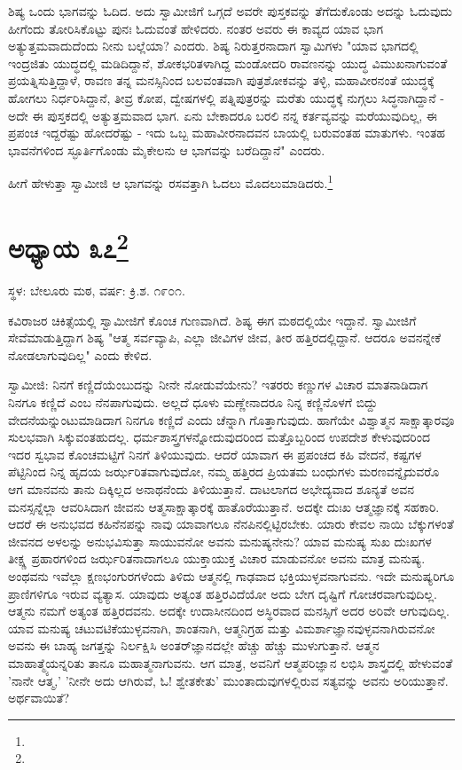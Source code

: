 ಶಿಷ್ಯ ಒಂದು ಭಾಗವನ್ನು ಓದಿದ. ಅದು ಸ್ವಾಮೀಜಿಗೆ ಒಗ್ಗದೆ ಅವರೇ ಪುಸ್ತಕವನ್ನು ತೆಗೆದುಕೊಂಡು ಅದನ್ನು ಓದುವುದು ಹೀಗೆಂದು ತೋರಿಸಿಕೊಟ್ಟು ಪುನಃ ಓದುವಂತೆ ಹೇಳಿದರು. ನಂತರ ಅವರು ಈ ಕಾವ್ಯದ ಯಾವ ಭಾಗ ಅತ್ಯುತ್ತಮವಾದುದೆಂದು ನೀನು ಬಲ್ಲೆಯಾ? ಎಂದರು. ಶಿಷ್ಯ ನಿರುತ್ತರನಾದಾಗ ಸ್ವಾಮಿಗಳು "ಯಾವ ಭಾಗದಲ್ಲಿ ಇಂದ್ರಜಿತು ಯುದ್ಧದಲ್ಲಿ ಮಡಿದಿದ್ದಾನೆ, ಶೋಕಭರಿತಳಾಗಿದ್ದ ಮಂಡೋದರಿ ರಾವಣನನ್ನು ಯುದ್ಧ ವಿಮುಖನಾಗುವಂತೆ ಪ್ರಯತ್ನಿಸುತ್ತಿದ್ದಾಳೆ, ರಾವಣ ತನ್ನ ಮನಸ್ಸಿನಿಂದ ಬಲವಂತವಾಗಿ ಪುತ್ರಶೋಕವನ್ನು ತಳ್ಳಿ, ಮಹಾವೀರನಂತೆ ಯುದ್ಧಕ್ಕೆ ಹೋಗಲು ನಿರ್ಧರಿಸಿದ್ದಾನೆ, ತೀವ್ರ ಕೋಪ, ದ್ವೇಷಗಳಲ್ಲಿ ಪತ್ನಿಪುತ್ರರನ್ನು ಮರೆತು ಯುದ್ಧಕ್ಕೆ ನುಗ್ಗಲು ಸಿದ್ಧನಾಗಿದ್ದಾನೆ - ಅದೇ ಈ ಪುಸ್ತಕದಲ್ಲಿ ಅತ್ಯುತ್ತಮವಾದ ಭಾಗ. ಏನು ಬೇಕಾದರೂ ಬರಲಿ ನನ್ನ ಕರ್ತವ್ಯವನ್ನು ಮರೆಯುವುದಿಲ್ಲ, ಈ ಪ್ರಪಂಚ ಇದ್ದರೆಷ್ಟು ಹೋದರೆಷ್ಟು - ಇದು ಒಬ್ಬ ಮಹಾವೀರನಾದವನ ಬಾಯಲ್ಲಿ ಬರುವಂತಹ ಮಾತುಗಳು. ಇಂತಹ ಭಾವನೆಗಳಿಂದ ಸ್ಫೂರ್ತಿಗೊಂಡು ಮೈಕೇಲನು ಆ ಭಾಗವನ್ನು ಬರೆದಿದ್ದಾನೆ" ಎಂದರು.

ಹೀಗೆ ಹೇಳುತ್ತಾ ಸ್ವಾಮೀಜಿ ಆ ಭಾಗವನ್ನು ರಸವತ್ತಾಗಿ ಓದಲು ಮೊದಲುಮಾಡಿದರು.\footnote{}

\newpage

\chapter[ಅಧ್ಯಾಯ ೩೭]{ಅಧ್ಯಾಯ ೩೭\protect\footnote{}}

\begin{center}
ಸ್ಥಳ: ಬೇಲೂರು ಮಠ, ವರ್ಷ: ಕ್ರಿ.ಶ. ೧೯೦೧.
\end{center}

ಕವಿರಾಜರ ಚಿಕಿತ್ಸೆಯಲ್ಲಿ ಸ್ವಾಮೀಜಿಗೆ ಕೊಂಚ ಗುಣವಾಗಿದೆ. ಶಿಷ್ಯ ಈಗ ಮಠದಲ್ಲಿಯೇ ಇದ್ದಾನೆ. ಸ್ವಾಮೀಜಿಗೆ ಸೇವೆಮಾಡುತ್ತಿದ್ದಾಗ ಶಿಷ್ಯ "ಆತ್ಮ ಸರ್ವವ್ಯಾಪಿ, ಎಲ್ಲಾ ಜೀವಿಗಳ ಜೀವ, ತೀರ ಹತ್ತಿರದಲ್ಲಿದ್ದಾನೆ. ಆದರೂ ಅವನನ್ನೇಕೆ ನೋಡಲಾಗುವುದಿಲ್ಲ" ಎಂದು ಕೇಳಿದ.

ಸ್ವಾಮೀಜಿ: ನಿನಗೆ ಕಣ್ಣಿದೆಯೆಂಬುದನ್ನು ನೀನೇ ನೋಡುವೆಯೇನು? ಇತರರು ಕಣ್ಣುಗಳ ವಿಚಾರ ಮಾತನಾಡಿದಾಗ ನಿನಗೂ ಕಣ್ಣಿದೆ ಎಂಬ ನೆನಪಾಗುವುದು. ಅಲ್ಲದೆ ಧೂಳು ಮಣ್ಣೇನಾದರೂ ನಿನ್ನ ಕಣ್ಣಿನೊಳಗೆ ಬಿದ್ದು ವೇದನೆಯನ್ನುಂಟುಮಾಡಿದಾಗ ನಿನಗೂ ಕಣ್ಣಿದೆ ಎಂದು ಚೆನ್ನಾಗಿ ಗೊತ್ತಾಗುವುದು. ಹಾಗೆಯೇ ವಿಶ್ವಾತ್ಮನ ಸಾಕ್ಷಾತ್ಕಾರವೂ ಸುಲಭವಾಗಿ ಸಿಕ್ಕುವಂತಹುದಲ್ಲ. ಧರ್ಮಶಾಸ್ತ್ರಗಳನ್ನೋದುವುದರಿಂದ ಮತ್ತೊಬ್ಬರಿಂದ ಉಪದೇಶ ಕೇಳುವುದರಿಂದ ಇದರ ಸ್ವಭಾವ ಕೊಂಚಮಟ್ಟಿಗೆ ನಿನಗೆ ತಿಳಿಯುವುದು. ಆದರೆ ಯಾವಾಗ ಈ ಪ್ರಪಂಚದ ಕಹಿ ವೇದನೆ, ಕಷ್ಟಗಳ ಪೆಟ್ಟಿನಿಂದ ನಿನ್ನ ಹೃದಯ ಜರ್ಝರಿತವಾಗುವುದೋ, ನಮ್ಮ ಹತ್ತಿರದ ಪ್ರಿಯತಮ ಬಂಧುಗಳು ಮರಣವನ್ನೈದುವರೊ ಆಗ ಮಾನವನು ತಾನು ದಿಕ್ಕಿಲ್ಲದ ಅನಾಥನೆಂದು ತಿಳಿಯುತ್ತಾನೆ. ದಾಟಲಾಗದ ಅಭೇದ್ಯವಾದ ಶೂನ್ಯತೆ ಅವನ ಮನಸ್ಸನ್ನೆಲ್ಲಾ ಆವರಿಸಿದಾಗ ಜೀವನು ಆತ್ಮಸಾಕ್ಷಾತ್ಕಾರಕ್ಕೆ ಹಾತೊರೆಯುತ್ತಾನೆ. ಅದಕ್ಕೇ ದುಃಖ ಆತ್ಮಜ್ಞಾನಕ್ಕೆ ಸಹಕಾರಿ. ಆದರೆ ಈ ಅನುಭವದ ಕಹಿನೆನಪನ್ನು ನಾವು ಯಾವಾಗಲೂ ನೆನಪಿನಲ್ಲಿಟ್ಟಿರಬೇಕು. ಯಾರು ಕೇವಲ ನಾಯಿ ಬೆಕ್ಕುಗಳಂತೆ ಜೀವನದ ಅಳಲನ್ನು ಅನುಭವಿಸುತ್ತಾ ಸಾಯುವನೋ ಅವನು ಮನುಷ್ಯನೇನು? ಯಾವ ಮನುಷ್ಯ ಸುಖ ದುಃಖಗಳ ತೀಕ್ಷ್ಣ ಪ್ರಹಾರಗಳಿಂದ ಜರ್ಝರಿತನಾದಾಗಲೂ ಯುಕ್ತಾಯುಕ್ತ ವಿಚಾರ ಮಾಡುವನೋ ಅವನು ಮಾತ್ರ ಮನುಷ್ಯ. ಅಂಥವನು ಇವೆಲ್ಲಾ ಕ್ಷಣಭಂಗುರಗಳೆಂದು ತಿಳಿದು ಆತ್ಮನಲ್ಲಿ ಗಾಢವಾದ ಭಕ್ತಿಯುಳ್ಳವನಾಗುವನು. ಇದೇ ಮನುಷ್ಯರಿಗೂ ಪ್ರಾಣಿಗಳಿಗೂ ಇರುವ ವ್ಯತ್ಯಾಸ. ಯಾವುದು ಅತ್ಯಂತ ಹತ್ತಿರವಿದೆಯೋ ಅದು ಬೇಗ ದೃಷ್ಟಿಗೆ ಗೋಚರವಾಗುವುದಿಲ್ಲ. ಆತ್ಮನು ನಮಗೆ ಅತ್ಯಂತ ಹತ್ತಿರದವನು. ಅದಕ್ಕೇ ಉದಾಸೀನದಿಂದ ಅಸ್ಥಿರವಾದ ಮನಸ್ಸಿಗೆ ಅದರ ಅರಿವೇ ಆಗುವುದಿಲ್ಲ. ಯಾವ ಮನುಷ್ಯ ಚಟುವಟಿಕೆಯುಳ್ಳವನಾಗಿ, ಶಾಂತನಾಗಿ, ಆತ್ಮನಿಗ್ರಹ ಮತ್ತು ವಿಮರ್ಶಾಜ್ಞಾನವುಳ್ಳವನಾಗಿರುವನೋ ಅವನು ಈ ಬಾಹ್ಯ ಜಗತ್ತನ್ನು ನಿರ್ಲಕ್ಷಿಸಿ ಅಂತರ್‌ಜ್ಞಾನದಲ್ಲೇ ಹೆಚ್ಚು ಹೆಚ್ಚು ಮುಳುಗುತ್ತಾನೆ. ಆತ್ಮನ ಮಾಹಾತ್ಮ್ಯೆಯನ್ನರಿತು ತಾನೂ ಮಹಾತ್ಮನಾಗುವನು. ಆಗ ಮಾತ್ರ, ಅವನಿಗೆ ಆತ್ಮಪರಿಜ್ಞಾನ ಲಭಿಸಿ ಶಾಸ್ತ್ರದಲ್ಲಿ ಹೇಳುವಂತೆ 'ನಾನೇ ಆತ್ಮ,' 'ನೀನೇ ಅದು ಆಗಿರುವೆ, ಓ! ಶ್ವೇತಕೇತು' ಮುಂತಾದುವುಗಳಲ್ಲಿರುವ ಸತ್ಯವನ್ನು ಅವನು ಅರಿಯುತ್ತಾನೆ. ಅರ್ಥವಾಯಿತೆ?

